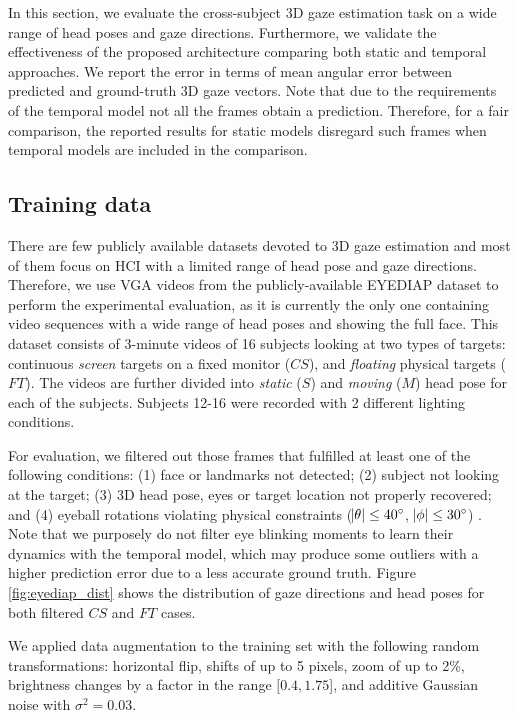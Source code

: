 \documentclass{bmvc2k}
\begin{document}
In this section, we evaluate the cross-subject 3D gaze estimation task on a wide range of head poses and gaze directions. Furthermore, we validate the effectiveness of the proposed architecture comparing both static and temporal approaches. We report the error in terms of mean angular error between predicted and ground-truth 3D gaze vectors. Note that due to the requirements of the temporal model not all the frames obtain a prediction. Therefore, for a fair comparison, the reported results for static models disregard such frames when temporal models are included in the comparison.

\subsection{Training data}
\label{sec:dataset}


There are few publicly available datasets devoted to 3D gaze estimation and most of them focus on HCI with a limited range of head pose and gaze directions. Therefore, we use VGA videos from the publicly-available EYEDIAP dataset \cite{FunesMora_ETRA_2014} to perform the experimental evaluation, as it is currently the only one containing video sequences with a wide range of head poses and showing the full face. This dataset consists of 3-minute videos of 16 subjects looking at two types of targets: continuous \textit{screen} targets on a fixed monitor ($CS$), and \textit{floating} physical targets ($FT$). The videos are further divided into \textit{static} ($S$) and \textit{moving} ($M$) head pose for each of the subjects. Subjects 12-16 were recorded with 2 different lighting conditions.

For evaluation, we filtered out those frames that fulfilled at least one of the following conditions: (1) face or landmarks not detected; (2) subject not looking at the target; (3) 3D head pose, eyes or target location not properly recovered; and (4) eyeball rotations violating physical constraints ($\abs{\theta} \le 40^\circ$, $\abs{\phi} \le 30^\circ$) \cite{msccirc}. Note that we purposely do not filter eye blinking moments to learn their dynamics with the temporal model, which may produce some outliers with a higher prediction error due to a less accurate ground truth. Figure \ref{fig:eyediap_dist} shows the distribution of gaze directions and head poses for both filtered $CS$ and $FT$ cases.

We applied data augmentation to the training set with the following random transformations:  horizontal flip, shifts of up to 5 pixels, zoom of up to 2\%, brightness changes by a factor in the range $[0.4, 1.75$], and additive Gaussian noise with $\sigma^2 = 0.03$.
\end{document}
